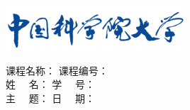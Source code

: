 \begin{center}
	\includegraphics[width=0.5\textwidth]{sources/logo.png}
\end{center}

\vspace*{0.8cm}
\newlength{\nlength}
\setlength{\nlength}{5cm}


\begin{center}
课程名称：\underline{\makebox[\nlength]{\coursename}}\quad\quad
课程编号：\underline{\makebox[\nlength]{\courseno}}\\
\vspace*{1mm}
姓~ \quad ~名：\underline{\makebox[\nlength]{\stuname}}\quad\quad
学~ \quad ~号：\underline{\makebox[\nlength]{\stuno}}\\
\vspace*{1mm}
主~ \quad ~题：\underline{\makebox[\nlength]{\content}}\quad\quad
日~ \quad ~期：\underline{}\\\vspace*{1mm}
\end{center}

\vspace*{1.2cm}